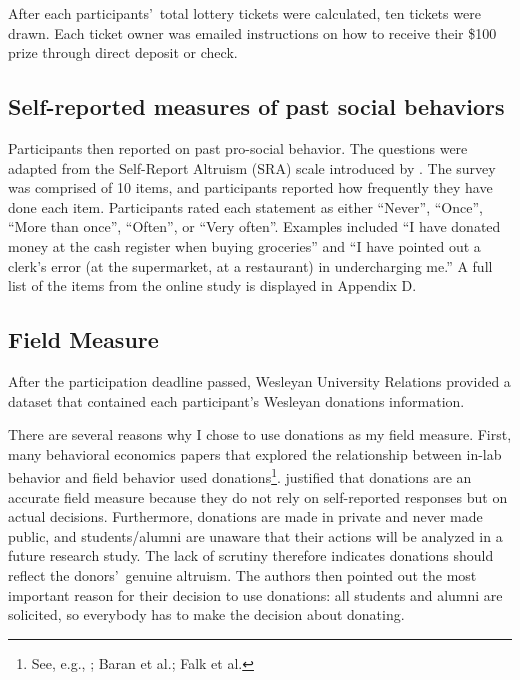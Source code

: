 \documentclass[12pt]{article}
\begin{document}
After each participants\rq \ total lottery tickets were calculated, ten tickets were drawn. Each ticket owner was emailed instructions on how to receive their \$100 prize through direct deposit or check. 

\subsection{Self-reported measures of past social behaviors}

Participants then reported on past pro-social behavior. The questions were adapted from the Self-Report Altruism (SRA) scale introduced by \cite{rushton_chrisjohn_fekken_1981}. The survey was comprised of 10 items, and participants reported how frequently they have done each item. Participants rated each statement as either ``Never'', ``Once'', ``More than once'', ``Often'', or ``Very often''. Examples included ``I have donated money at the cash register when buying groceries'' and ``I have pointed out a clerk\rq s error (at the supermarket, at a restaurant) in undercharging me.'' A full list of the items from the online study is displayed in Appendix D. 

\subsection{Field Measure}

After the participation deadline passed, Wesleyan University Relations provided a dataset that contained each participant\rq s Wesleyan donations information.

There are several reasons why I chose to use donations as my field measure. First, many behavioral economics papers that explored the relationship between in-lab behavior and field behavior used donations\footnote{See, e.g., \cite{benz_meier_2006}; Baran et al.; Falk et al.}. \cite{falk_2013} justified that donations are an accurate field measure because they do not rely on self-reported responses but on actual decisions. Furthermore, donations are made in private and never made public, and students/alumni are unaware that their actions will be analyzed in a future research study. The lack of scrutiny therefore indicates donations should reflect the donors\rq \ genuine altruism. The authors then pointed out the most important reason for their decision to use donations: all students and alumni are solicited, so everybody has to make the decision about donating.
\end{document}

